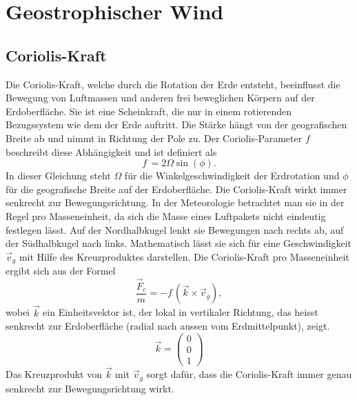 %
%
%
%
\section{Geostrophischer Wind
\label{geostrophisch:section:geoWind}}


\subsection{Coriolis-Kraft
\label{geostrophisch:subsection:coriolis}}
Die Coriolis-Kraft, welche durch die Rotation der Erde entsteht, beeinflusst die Bewegung von Luftmassen und anderen frei beweglichen Körpern auf der Erdoberfläche. Sie ist eine Scheinkraft, die nur in einem rotierenden Bezugssystem wie dem der Erde auftritt. Die Stärke hängt von der geografischen Breite ab und nimmt in Richtung der Pole zu.
Der Coriolis-Parameter $f$ beschreibt diese Abhängigkeit und ist definiert als 
\begin{equation}
f\, 
= 
2\Omega\sin(\phi)
\label{geostrophisch:equation1}.
\end{equation}
In dieser Gleichung steht $\Omega$ für die Winkelgeschwindigkeit der Erdrotation und $\phi$ für die geografische Breite auf der Erdoberfläche.
Die Coriolis-Kraft wirkt immer senkrecht zur Bewegungsrichtung. In der Meteorologie betrachtet man sie in der Regel pro Masseneinheit, da sich die Masse eines Luftpakets nicht eindeutig festlegen lässt. Auf der Nordhalbkugel lenkt sie Bewegungen nach rechts ab, auf der Südhalbkugel nach links. Mathematisch lässt sie sich für eine Geschwindigkeit $\vec{v}_g $ mit Hilfe des Kreuzproduktes darstellen. 
Die Coriolis-Kraft pro Masseneinheit ergibt sich aus der Formel
\begin{equation}
\frac{\vec{F}_c} {m}
= 
-f\, (\vec{k} \times \vec{v}_g) 
\label{geostrophisch:equation2},
\end{equation}
wobei $\vec{k}$ ein Einheitsvektor ist, der lokal in vertikaler Richtung, das heisst senkrecht zur Erdoberfläche (radial nach aussen vom Erdmittelpunkt), zeigt.
\begin{equation}
\vec{k} =
\left(
\begin{array}{c}
0 \\
0 \\
1
\end{array}
\right)
\label{geostrophisch:equation3}
\end{equation}
Das Kreuzprodukt von $\vec{k}$ mit  $\vec{v}_g $ sorgt dafür, dass die Coriolis-Kraft immer genau senkrecht zur Bewegungsrichtung wirkt.

